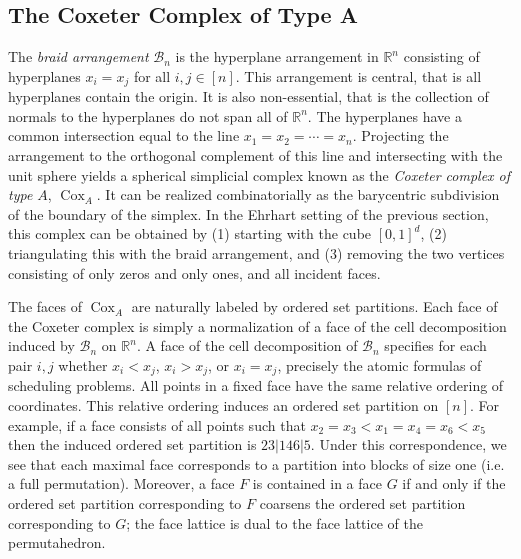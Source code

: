 \documentclass[12pt,reqno]{amsart}
\numberwithin{definition}{section}
\theoremstyle{definition}
\newcommand{\cox}{\operatorname{Cox}}
\begin{document}
\subsection{The Coxeter Complex of Type A}
The \emph{braid arrangement} $\mathcal{B}_n$ is the hyperplane arrangement in
$\mathbb{R}^n$ consisting of hyperplanes $x_i = x_j$ for all $i,j \in [n]$.
This arrangement is central, that is all hyperplanes contain
the origin.  It is also non-essential, that is the collection of
normals to the hyperplanes do not span all of $\mathbb{R}^n$.  The
hyperplanes have a common intersection equal to the line $x_1 = x_2 = \cdots
= x_n$.  Projecting the arrangement to the orthogonal complement of
this line and intersecting with the unit sphere yields a spherical
simplicial complex known as the \emph{Coxeter complex of type $A$}, $\cox_A$.
It can be realized combinatorially as the barycentric subdivision of the
boundary of the simplex.  In the Ehrhart setting of the previous section, this complex
can be obtained by (1) starting with the cube $[0,1]^d$, (2) triangulating 
this with the braid arrangement, and (3) removing the two vertices consisting of 
only zeros and only ones, and all incident faces. 


The faces of $\cox_A$ are naturally  labeled by ordered
set partitions.  Each face of the Coxeter complex is simply a
normalization of a face of the cell decomposition induced by
$\mathcal{B}_n$ on $\mathbb{R}^n$.  A face of the cell decomposition of $\mathcal{B}_n$ specifies for each pair $i,j$ whether $x_i < x_j$, $x_i > x_j$, or $x_i = x_j$, precisely the atomic formulas of scheduling problems.  All points in a fixed face have
the same relative ordering of coordinates.  This relative ordering
induces an ordered set partition on $[n]$.  For example, if a face
consists of all points such that $x_2 = x_3 < x_1 =
x_4 = x_6 < x_5$ then the induced ordered set partition is
$23|146|5$.  Under this correspondence, we see that each maximal face
corresponds to a partition into blocks of size one (i.e. a full
permutation).  Moreover, a face $F$ is contained in a face $G$ if and only if
the ordered set partition corresponding to $F$ coarsens the ordered set partition
corresponding to $G$; the face lattice is dual to the face lattice of the permutahedron.
\end{document}
